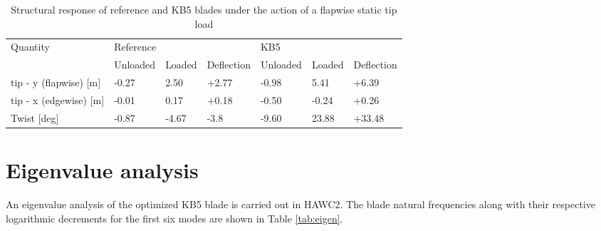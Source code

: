 \begin{table}[pth]
\centering
\caption{Structural response of reference and KB5 blades under the action of a flapwise static tip load}
\label{tab:flap_static_load_test}
\begin{tabular}{|l|l|l|l|l|l|l|}
\hline
\multirow{2}{*}{Quantity}  & \multicolumn{3}{l|}{Reference} & \multicolumn{3}{l|}{KB5}       \\ \cline{2-7} 
                           & Unloaded & Loaded & Deflection & Unloaded & Loaded & Deflection \\ \hline
tip - y (flapwise) {[}m{]} & -0.27    & 2.50   & +2.77      & -0.98    & 5.41   & +6.39      \\
tip - x (edgewise) {[}m{]} & -0.01    & 0.17   & +0.18      & -0.50    & -0.24  & +0.26      \\
Twist {[}deg{]}            & -0.87    & -4.67  & -3.8       & -9.60    & 23.88  & +33.48      \\ \hline
\end{tabular}
\end{table}


\section{Eigenvalue analysis}
\label{sec:eigen}
An eigenvalue analysis of the optimized KB5 blade is carried out in HAWC2. The blade natural frequencies along with their respective logarithmic decrements for the first six modes are shown in Table \ref{tab:eigen}.

